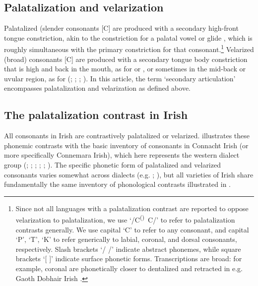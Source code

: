 \documentclass[output=paper,colorlinks,citecolor=brown]{langscibook}
\newcommand{\pal}{\ipa{ʲ}}
\newcommand{\vel}{\ipa{ˠ}}
\newcommand{\velop}{\textsuperscript{(}\vel\textsuperscript{)}}
\newcommand{\palcongen}{/C\velop\ C\pal/}
\begin{document}
\subsection{Palatalization and velarization}
Palatalized (slender consonants [C\pal] are produced with a secondary high-front tongue constriction, akin to the constriction for a palatal vowel \ipa{[i]} or glide \ipa{[j]}, which is roughly simultaneous with the primary constriction for that consonant.\footnote{Since not all languages with a palatalization contrast are reported to oppose velarization to palatalization, we use `\palcongen' to refer to palatalization contrasts generally. We use capital `C' to refer to any consonant, and capital `P', `T', `K' to refer generically to labial, coronal, and dorsal consonants, respectively. Slash brackets `/ /' indicate abstract phonemes, while square brackets `[ ]' indicate surface phonetic forms. Transcriptions are broad: for example, coronal \ipa{[d\vel\ d\pal]} are phonetically closer to dentalized \ipa{[d̪\vel]} and retracted \ipa{[d̠\pal]} in e.g. Gaoth Dobhair Irish \citep{NiChasaide1995_Irish}.} Velarized (broad) consonants [C\vel] are produced with a secondary tongue body constriction that is high and back in the mouth, as for \ipa{[ɯ u]} or \ipa{[ɰ w]}, or sometimes in the mid-back or uvular region, as for \ipa{[ɤ o]} (\cite{IPA_handbook1999}; \cite{Kochetov2002_diss}; \cite{Bennett_etal2018_Conamara_ultrasound}; \cite{Shaw_etal2021_complex_segments}). In this article, the term `secondary articulation' encompasses palatalization and velarization as defined above.
\subsection{The palatalization contrast in Irish}
All consonants in Irish are contrastively palatalized or velarized.  illustrates these phonemic contrasts with the basic inventory of consonants in Connacht Irish (or more specifically Connemara Irish), which here represents the western dialect group (\cite{DeBhaldraithe1975_Cois_Fhairrge}; \cite{ModernIrish}; \cite{NiChiosain_1991_diss}; \citeyear{NiChiosain1994_Irish_place_features}; \citeyear{NiChiosain1999_Irish_phonotactics}; \cite{NiChiosain_Padgett2012_Irish_pal_acous_percep}). The specific phonetic form of palatalized and velarized consonants varies somewhat across dialects (e.g. \cite{NiChasaide1995_Irish}; \cite{Hickey2011_Irish_dialects}), but all varieties of Irish share fundamentally the same inventory of phonological contrasts illustrated in .
\end{document}
